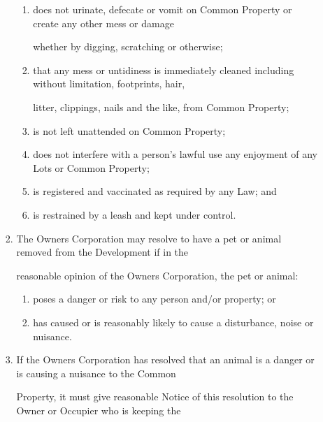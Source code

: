 \documentclass{article}
\begin{document}
\begin{enumerate}[label=\arabic*.]
\begin{enumerate}[label=\arabic{enumi}.\arabic*.]
\begin{enumerate}[label=(\arabic*)]
\begin{enumerate}[label=(\alph*)]
\item {\fontsize{9.962}{1} does not urinate, defecate or vomit on Common Property or create any other mess or damage }

{\fontsize{10.02}{1}whether by digging, scratching or otherwise; }

\item {\fontsize{9.962}{1} that any mess or untidiness is immediately cleaned including without limitation, footprints, hair, }

{\fontsize{10.02}{1}litter, clippings, nails and the like,  from Common Property; }

\item {\fontsize{9.962}{1} is not left unattended on Common Property; }

\item {\fontsize{9.962}{1} does not interfere with a person’s lawful use any enjoyment of any Lots or Common Property; }

\item {\fontsize{9.962}{1} is registered and vaccinated as required by any Law; and }

\item {\fontsize{9.962}{1} is restrained by a leash and kept under control. }

\end{enumerate}
\item {\fontsize{9.962}{1} The Owners Corporation may resolve to have a pet or animal removed from the Development if in the }

{\fontsize{10.02}{1}reasonable opinion of the Owners Corporation, the pet or animal: }

\newpage

\begin{enumerate}[label=(\alph*)]
\item {\fontsize{9.962}{1} poses a danger or risk to any person and/or property; or }

\item {\fontsize{9.962}{1} has caused or is reasonably likely to cause a disturbance, noise or nuisance. }

\end{enumerate}
\item {\fontsize{9.962}{1} If the Owners Corporation has resolved that an animal is a danger or is causing a nuisance to the Common }

{\fontsize{10.02}{1}Property, it must give reasonable Notice of this resolution to the Owner or Occupier who is keeping the }


\end{enumerate}
\end{enumerate}
\end{enumerate}
\end{document}
